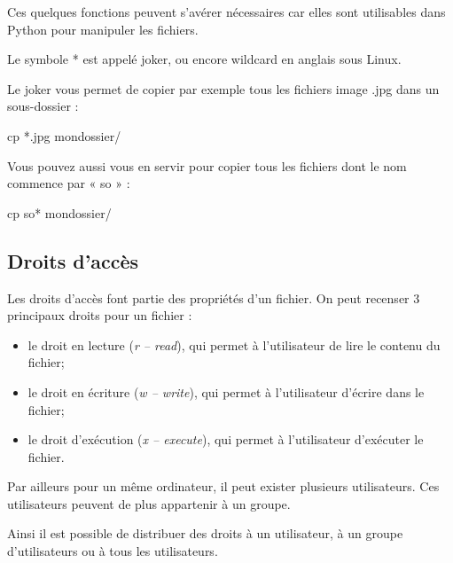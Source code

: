 \documentclass[10pt,fleqn]{article} %
\begin{document}
Ces quelques fonctions peuvent s'avérer nécessaires car elles sont utilisables dans Python pour manipuler les fichiers. 


Le symbole * est appelé joker, ou encore wildcard en anglais sous Linux. 

\begin{minipage}[c]{.46\linewidth}
\begin{term}

Le joker vous permet de copier par exemple tous les fichiers image .jpg dans un sous-dossier :
\begin{termi}[h]
cp *.jpg mondossier/
\end{termi}
\end{term}
\end{minipage}\hfill
\begin{minipage}[c]{.46\linewidth}
\begin{term}
Vous pouvez aussi vous en servir pour copier tous les fichiers dont le nom commence par « so » :
\begin{termi}[h]
cp so* mondossier/
\end{termi}
\end{term}
\end{minipage}

\subsection{Droits d’accès}

Les droits d'accès font partie des propriétés d'un fichier. On peut recenser 3 principaux droits pour un fichier : 
\begin{itemize}
\item le droit en lecture (\textit{r -- read}), qui permet à l'utilisateur de lire le contenu du fichier;
\item le droit en écriture (\textit{w -- write}), qui permet à l'utilisateur d'écrire dans le fichier;
\item le droit d'exécution (\textit{x -- execute}), qui permet à l'utilisateur d'exécuter le fichier.
\end{itemize}

Par ailleurs pour un même ordinateur, il peut exister plusieurs utilisateurs. Ces utilisateurs peuvent de plus appartenir à un groupe.

Ainsi il est possible de distribuer des droits à un utilisateur, à un groupe d'utilisateurs ou à tous les utilisateurs.  
\end{document}

